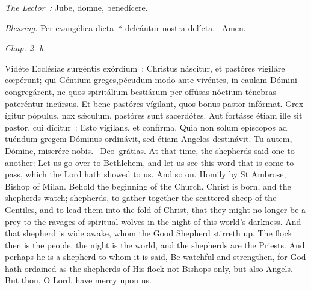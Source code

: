 {{  }

  {
    \bigskip
    {
    }
    \medskip

    \emph{The Lector~:} Jube, domne, benedícere.

    \emph{Blessing.} Per evangélica dicta~* deleántur nostra delícta. \Rbar{}~Amen.
  }

  \bigskip{}
  {


  }

  {
    \hspace{10ex}{Lesson VIII.}\hfill\emph{Chap. 2. b.}\hspace{10ex}

    \begin{parcolumns}[rulebetween,colwidths={1=.45\linewidth}]{2}
    {Vidéte Ecclésiae surgéntis exórdium~: Christus náscitur, et pastóres vigiláre cœpérunt; qui Géntium greges,}{pécudum modo ante vivéntes, in caulam Dómini congregárent, ne quos spiritálium bestiárum per offúsas nóctium ténebras pateréntur incúrsus. Et bene pastóres vígilant, quos bonus pastor infórmat. Grex ígitur pópulus, nox sǽculum, pastóres sunt sacerdótes. Aut fortásse étiam ille sit pastor, cui dícitur~: Esto vígilans, et confírma. Quia non solum epíscopos ad tuéndum gregem Dóminus ordinávit, sed étiam Angelos destinávit.
      Tu autem, Dómine, miserére nobis.
      \Rbar{}~Deo~grátias.}
    {At that time, the shepherds said one to another: Let us go over to Bethlehem, and let us see this word that is come to pass, which the Lord hath showed to us. And so on.}
    {Homily by St Ambrose, Bishop of Milan.}
    {Behold the beginning of the Church. Christ is born, and the shepherds watch; shepherds, to gather together the scattered sheep of the Gentiles, and to lead them into the fold of Christ, that they might no longer be a prey to the ravages of spiritual wolves in the night of this world's darkness. And that shepherd is wide awake, whom the Good Shepherd stirreth up. The flock then is the people, the night is the world, and the shepherds are the Priests. And perhaps he is a shepherd to whom it is said, Be watchful and strengthen, for God hath ordained as the shepherds of His flock not Bishops only, but also Angels.
      But thou, O Lord, have mercy upon us.}
    \end{parcolumns}

}}
